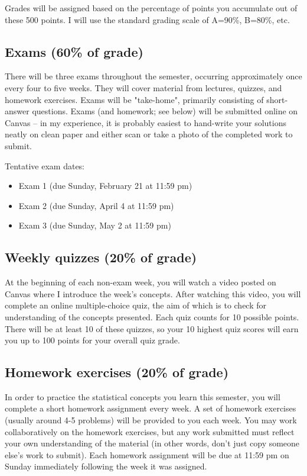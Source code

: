 \documentclass[10pt]{article}
\begin{document}
Grades will be assigned based on the percentage of points you accumulate out of these 500 points.  I will use the standard grading scale of A=90\%, B=80\%, etc.

\subsection*{Exams (60\% of grade)}
\label{sec:orgb25826e}
There will be three exams throughout the semester, occurring approximately once every four to five weeks.  They will cover material from lectures, quizzes, and homework exercises. Exams will be "take-home", primarily consisting of short-answer questions. Exams (and homework; see below) will be submitted online on Canvas -- in my experience, it is probably easiest to hand-write your solutions neatly on clean paper and either scan or take a photo of the completed work to submit. 

Tentative exam dates:

\begin{itemize}
\item Exam 1 (due Sunday, February 21 at 11:59 pm)
\item Exam 2 (due Sunday, April 4 at 11:59 pm)
\item Exam 3 (due Sunday, May 2 at 11:59 pm)
\end{itemize}

\subsection*{Weekly quizzes (20\% of grade)}
\label{sec:org3531b53}

At the beginning of each non-exam week, you will watch a video posted on Canvas where I introduce the week's concepts. After watching this video, you will complete an online multiple-choice quiz, the aim of which is to check for understanding of the concepts presented. Each quiz counts for 10 possible points. There will be at least 10 of these quizzes, so your 10 highest quiz scores will earn you up to 100 points for your overall quiz grade.

\subsection*{Homework exercises (20\% of grade)}
\label{sec:org5ec445f}
In order to practice the statistical concepts you learn this semester, you will complete a short homework assignment every week. A set of homework exercises (usually around 4-5 problems) will be provided to you each week. You may work collaboratively on the homework exercises, but any work submitted must reflect your own understanding of the material (in other words, don't just copy someone else's work to submit).  Each homework assignment will be due at 11:59 pm on Sunday immediately following the week it was assigned.
\end{document}
